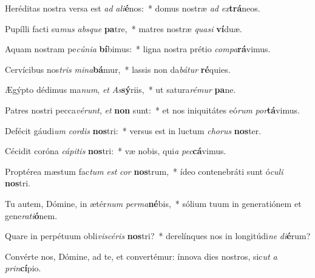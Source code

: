 \item Heréditas nostra versa est \textit{ad} \textit{a}\textit{li}\textbf{é}nos:~* domus nostræ \textit{ad} \textit{ex}\textbf{trá}neos.
\item Pupílli facti su\textit{mus} \textit{abs}\textit{que} \textbf{pa}tre,~* matres nostræ \textit{qua}\textit{si} \textbf{ví}duæ.
\item Aquam nostram pe\textit{cú}\textit{ni}\textit{a} \textbf{bí}bimus:~* ligna nostra prétio \textit{com}\textit{pa}\textbf{rá}vimus.
\item Cervícibus nos\textit{tris} \textit{mi}\textit{na}\textbf{bá}mur,~* lassis non da\textit{bá}\textit{tur} \textbf{ré}quies.
\item Ægýpto dédimus ma\textit{num}, \textit{et} \textit{As}\textbf{sý}riis,~* ut satura\textit{ré}\textit{mur} \textbf{pa}ne.
\item Patres nostri pecca\textit{vé}\textit{runt}, \textit{et} \textbf{non} sunt:~* et nos iniquitátes eó\textit{rum} \textit{por}\textbf{tá}vimus.
\item Defécit gáudi\textit{um} \textit{cor}\textit{dis} \textbf{nos}tri:~* versus est in luctum \textit{cho}\textit{rus} \textbf{nos}ter.
\item Cécidit coróna \textit{cá}\textit{pi}\textit{tis} \textbf{nos}tri:~* væ nobis, qui\textit{a} \textit{pec}\textbf{cá}vimus.
\item Proptérea mæstum fac\textit{tum} \textit{est} \textit{cor} \textbf{nos}trum,~* ídeo contenebráti sunt ó\textit{cu}\textit{li} \textbf{nos}tri.
\item Tu autem, Dómine, in ætér\textit{num} \textit{per}\textit{ma}\textbf{né}bis,~* sólium tuum in generatiónem et gene\textit{ra}\textit{ti}\textbf{ó}nem.
\item Quare in perpétuum obli\textit{vi}\textit{scé}\textit{ris} \textbf{nos}tri?~* derelínques nos in longitúdi\textit{ne} \textit{di}\textbf{é}rum?
\item Convérte nos, Dómine, ad te, et convertémur: ínnova dies nostros, sic\textit{ut} \textit{a} \textit{prin}\textbf{cí}pio.
